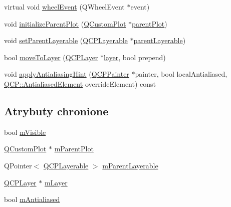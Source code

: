 \begin{DoxyCompactItemize}
\item 
virtual void \hyperlink{class_q_c_p_layerable_a47dfd7b8fd99c08ca54e09c362b6f022}{wheel\+Event} (Q\+Wheel\+Event $\ast$event)
\item 
void \hyperlink{class_q_c_p_layerable_a8cbe5a0c9a5674249982f5ca5f8e02bc}{initialize\+Parent\+Plot} (\hyperlink{class_q_custom_plot}{Q\+Custom\+Plot} $\ast$\hyperlink{class_q_c_p_layerable_ab7e0e94461566093d36ffc0f5312b109}{parent\+Plot})
\item 
void \hyperlink{class_q_c_p_layerable_aa23c893671f1f6744ac235cf2204cf3a}{set\+Parent\+Layerable} (\hyperlink{class_q_c_p_layerable}{Q\+C\+P\+Layerable} $\ast$\hyperlink{class_q_c_p_layerable_a98d79f5b716d45eac4347befe546d0ec}{parent\+Layerable})
\item 
bool \hyperlink{class_q_c_p_layerable_af94484cfb7cbbddb7de522e9be71d9a4}{move\+To\+Layer} (\hyperlink{class_q_c_p_layer}{Q\+C\+P\+Layer} $\ast$\hyperlink{class_q_c_p_layerable_aea67e8c19145e70d68c286a36f6b8300}{layer}, bool prepend)
\item 
void \hyperlink{class_q_c_p_layerable_a62bd552d1a45aa9accb24b310542279e}{apply\+Antialiasing\+Hint} (\hyperlink{class_q_c_p_painter}{Q\+C\+P\+Painter} $\ast$painter, bool local\+Antialiased, \hyperlink{namespace_q_c_p_ae55dbe315d41fe80f29ba88100843a0c}{Q\+C\+P\+::\+Antialiased\+Element} override\+Element) const 
\end{DoxyCompactItemize}
\subsection*{Atrybuty chronione}
\begin{DoxyCompactItemize}
\item 
bool \hyperlink{class_q_c_p_layerable_a62e3aed8427d6ce3ccf716f285106cb3}{m\+Visible}
\item 
\hyperlink{class_q_custom_plot}{Q\+Custom\+Plot} $\ast$ \hyperlink{class_q_c_p_layerable_aa2a528433e44db02b8aef23c1f9f90ed}{m\+Parent\+Plot}
\item 
Q\+Pointer$<$ \hyperlink{class_q_c_p_layerable}{Q\+C\+P\+Layerable} $>$ \hyperlink{class_q_c_p_layerable_a3291445a980053e2d17a21d15957624e}{m\+Parent\+Layerable}
\item 
\hyperlink{class_q_c_p_layer}{Q\+C\+P\+Layer} $\ast$ \hyperlink{class_q_c_p_layerable_aa38ec5891aff0f50b36fd63e9372a0cd}{m\+Layer}
\item 
bool \hyperlink{class_q_c_p_layerable_a3ab45a4c76a3333ce42eb217a81733ec}{m\+Antialiased}
\end{DoxyCompactItemize}
